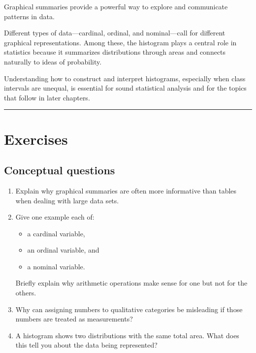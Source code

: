 \documentclass[
  letterpaper,
  DIV=11,
  numbers=noendperiod]{scrreprt}
\providecommand{\tightlist}{%
  \setlength{\itemsep}{0pt}\setlength{\parskip}{0pt}}
\begin{document}
\begin{tcolorbox}[enhanced jigsaw, coltitle=black, colbacktitle=quarto-callout-important-color!10!white, left=2mm, bottomrule=.15mm, bottomtitle=1mm, colback=white, titlerule=0mm, colframe=quarto-callout-important-color-frame, breakable, leftrule=.75mm, toptitle=1mm, opacitybacktitle=0.6, rightrule=.15mm, title=\textcolor{quarto-callout-important-color}{\faExclamation}\hspace{0.5em}{Chapter summary}, arc=.35mm, opacityback=0, toprule=.15mm]

Graphical summaries provide a powerful way to explore and communicate
patterns in data.

Different types of data---cardinal, ordinal, and nominal---call for
different graphical representations. Among these, the histogram plays a
central role in statistics because it summarizes distributions through
areas and connects naturally to ideas of probability.

Understanding how to construct and interpret histograms, especially when
class intervals are unequal, is essential for sound statistical analysis
and for the topics that follow in later chapters.

\end{tcolorbox}

\begin{center}\rule{0.5\linewidth}{0.5pt}\end{center}

\section{Exercises}\label{exercises}

\subsection{Conceptual questions}\label{conceptual-questions}

\begin{enumerate}
\def\labelenumi{\arabic{enumi}.}
\item
  Explain why graphical summaries are often more informative than tables
  when dealing with large data sets.
\item
  Give one example each of:

  \begin{itemize}
  \tightlist
  \item
    a cardinal variable,
  \item
    an ordinal variable, and
  \item
    a nominal variable.
  \end{itemize}

  Briefly explain why arithmetic operations make sense for one but not
  for the others.
\item
  Why can assigning numbers to qualitative categories be misleading if
  those numbers are treated as measurements?
\item
  A histogram shows two distributions with the same total area. What
  does this tell you about the data being represented?
\end{enumerate}
\end{document}
